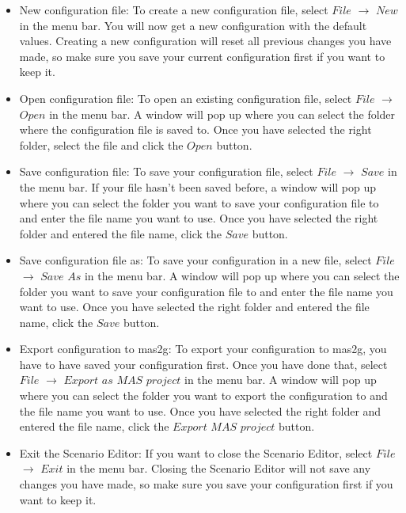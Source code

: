 \begin{itemize}

\item{New configuration file}:
To create a new configuration file, select $File$ $\to$ $New$ in the menu bar. You will now get a new configuration with the default values. Creating a new configuration will reset all previous changes you have made, so make sure you save your current configuration first if you want to keep it.


\item{Open configuration file}:
To open an existing configuration file, select $File$ $\to$ $Open$ in the menu bar. A window will pop up where you can select the folder where the configuration file is saved to. Once you have selected the right folder, select the file and click the $Open$ button.

\item{Save configuration file}:
To save your configuration file, select $File$ $\to$ $Save$ in the menu bar. If your file hasn't been saved before, a window will pop up where you can select the folder you want to save your configuration file to and enter the file name you want to use. Once you have selected the right folder and entered the file name, click the $Save$ button.

\item{Save configuration file as}:
To save your configuration in a new file, select $File$ $\to$ $Save$ $As$ in the menu bar. A window will pop up where you can select the folder you want to save your configuration file to and enter the file name you want to use. Once you have selected the right folder and entered the file name, click the $Save$ button.

\item{Export configuration to mas2g}:
To export your configuration to mas2g, you have to have saved your configuration first. Once you have done that, select $File$ $\to$ $Export$ $as$ $MAS$ $project$ in the menu bar. A window will pop up where you can select the folder you want to export the configuration to and the file name you want to use. Once you have selected the right folder and entered the file name, click the $Export$ $MAS$ $project$ button.

\item{Exit the Scenario Editor}:
If you want to close the Scenario Editor, select $File$ $\to$ $Exit$ in the menu bar. Closing the Scenario Editor will not save any changes you have made, so make sure you save your configuration first if you want to keep it.
\end{itemize}



